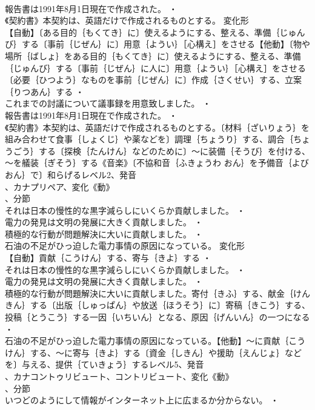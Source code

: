 \documentclass[8pt]{extreport}
\begin{document}
\begin{CJK}{UTF8}{min}
\\	報告書は1991年8月1日現在で作成された。 ・
\\	《契約書》本契約は、英語だけで作成されるものとする。	変化形 
\\	【自動】〔ある目的｛もくてき｝に〕使えるようにする、整える、準備｛じゅんび｝する〔事前｛じぜん｝に〕用意｛ようい｝［心構え］をさせる【他動】〔物や場所｛ばしょ｝をある目的｛もくてき｝に〕使えるようにする、整える、準備｛じゅんび｝する〔事前｛じぜん｝に人に〕用意｛ようい｝［心構え］をさせる〔必要｛ひつよう｝なものを事前｛じぜん｝に〕作成｛さくせい｝する、立案｛りつあん｝する ・
\\	これまでの討議について議事録を用意致しました。 ・
\\	報告書は1991年8月1日現在で作成された。 ・
\\	《契約書》本契約は、英語だけで作成されるものとする。〔材料｛ざいりょう｝を組み合わせて食事｛しょくじ｝や薬などを〕調理｛ちょうり｝する、調合｛ちょうごう｝する〔探検｛たんけん｝などのために〕～に装備｛そうび｝を付ける、～を艤装｛ぎそう｝する《音楽》〔不協和音｛ふきょうわ おん｝を予備音｛よび おん｝で〕和らげるレベル2、発音
\\	、カナプリペア、変化《動》
\\	、分節
\\	それは日本の慢性的な黒字減らしにいくらか貢献しました。 ・
\\	電力の発見は文明の発展に大きく貢献しました。 ・
\\	積極的な行動が問題解決に大いに貢献しました。 ・
\\	石油の不足がひっ迫した電力事情の原因になっている。	変化形 
\\	【自動】貢献｛こうけん｝する、寄与｛きよ｝する ・
\\	それは日本の慢性的な黒字減らしにいくらか貢献しました。 ・
\\	電力の発見は文明の発展に大きく貢献しました。 ・
\\	積極的な行動が問題解決に大いに貢献しました。寄付｛きふ｝する、献金｛けんきん｝する〔出版｛しゅっぱん｝や放送｛ほうそう｝に〕寄稿｛きこう｝する、投稿｛とうこう｝する一因｛いちいん｝となる、原因｛げんいん｝の一つになる ・
\\	石油の不足がひっ迫した電力事情の原因になっている。【他動】～に貢献｛こうけん｝する、～に寄与｛きよ｝する〔資金｛しきん｝や援助｛えんじょ｝などを〕与える、提供｛ていきょう｝するレベル5、発音
\\	、カナコントゥリビュート、コントリビュート、変化《動》
\\	、分節
\\	いつどのようにして情報がインターネット上に広まるか分からない。 ・

\end{CJK}
\end{document}
